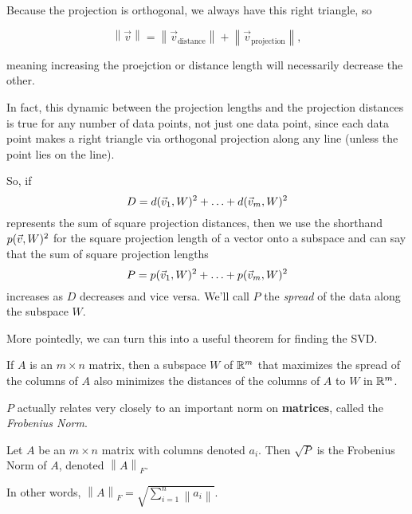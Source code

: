 \documentclass{ximera}
\begin{document}
\begin{problem}
\begin{feedback}
\begin{center}
     \end{center}

     Because the projection is orthogonal, we always have this right triangle, so 

     $$\left\|\vec{v}\right\|=\left\|\vec{v}_{\text{distance}}\right\|+\left\|\vec{v}_{\text{projection}}\right\|,$$

     meaning increasing the proejction or distance length will necessarily decrease the other.

  \end{feedback}



\end{problem}



In fact, this dynamic between the projection lengths and the projection distances is true for any number of data points, not just one data point, since each data point makes a right triangle via orthogonal projection along any line (unless the point lies on the line).

So, if \begin{equation*}
  D = d(\vec{v}_1,W)^2 + \ldots + d(\vec{v}_m,W)^2
\end{equation*} represents the sum of square projection distances, then we use the shorthand $p(\vec{v},W)^2$ for the square projection length of a vector onto a subspace and can say that the sum of square projection lengths \begin{equation*}
  P = p(\vec{v}_1,W)^2 + \ldots + p(\vec{v}_m,W)^2
\end{equation*} increases as $D$ decreases and vice versa. We'll call $P$ the \emph{spread} of the data along the subspace $W$.

More pointedly, we can turn this into a useful theorem for finding the SVD.

\begin{theorem}
  If $A$ is an $m\times n$ matrix, then a subspace $W$ of $\mathbb{R}^m$ that maximizes the spread of the columns of $A$ also minimizes the distances of the columns of $A$ to $W$ in $\mathbb{R}^m$.
\end{theorem}

$P$ actually relates very closely to an important norm on {\bf matrices}, called the \emph{Frobenius Norm}.

\begin{definition}
  Let $A$ be an $m\times n$ matrix with columns denoted $a_i$. Then $\sqrt{P}$ is the Frobenius Norm of $A$, denoted $\left\|A\right\|_F$. 

  In other words, $\left\|A\right\|_F=\sqrt{\sum_{i=1}^n\left\|a_i\right\|}$.
\end{definition}
\end{document}
